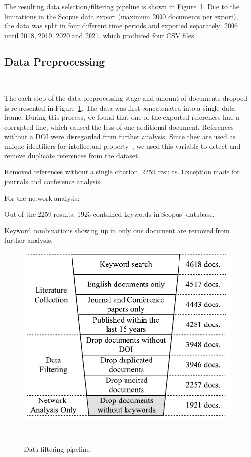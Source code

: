 \documentclass[parskip=full]{scrartcl}
\begin{document}
The resulting data selection/filtering pipeline is shown in
Figure~\ref{fig:data_filtering_pipeline}. Due to the limitations in the Scopus
data export (maximum 2000 documents per export), the data was split in four
different time periods and exported separately: 2006 until 2018, 2019, 2020
and 2021, which produced four CSV files.

\subsection{Data Preprocessing}~\label{sec:data_preprocessing}

The each step of the data preprocessing stage and amount of documents dropped
is represented in Figure~\ref{fig:data_filtering_pipeline}. The data was first
concatenated into a single data frame. During this process, we found that one
of the exported references had a corrupted line, which caused the loss of one
additional document. References without a DOI were disregarded from further
analysis. Since they are used as unique identifiers for intellectual
property~\cite{Paskin1999}, we used this variable to detect and remove
duplicate references from the dataset.

Removed references without a single citation, 2259 results. Exception made for
journals and conference analysis.  

For the network analysis:

Out of the 2259 results, 1923 contained keywords in Scopus' database.

Keyword combinations showing up in only one document are removed from further
analysis.


\begin{figure}[H]
	\centering
    \includegraphics[width=.55\linewidth]{../analysis/data_filtering_pipeline}
    \caption{Data filtering pipeline.
    }~\label{fig:data_filtering_pipeline}
\end{figure}
\end{document}
